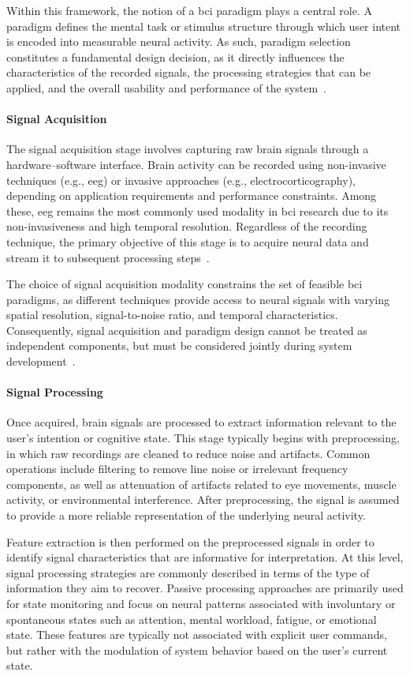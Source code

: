 Within this framework, the notion of a \gls{bci} paradigm plays a central role. A paradigm defines the mental task or stimulus structure through which user intent is encoded into measurable neural activity. As such, paradigm selection constitutes a fundamental design decision, as it directly influences the characteristics of the recorded signals, the processing strategies that can be applied, and the overall usability and performance of the system~\cite{wang-2025}.

\paragraph*{Signal Acquisition}
The signal acquisition stage involves capturing raw brain signals through a hardware--software interface. Brain activity can be recorded using non-invasive techniques (e.g., \gls{eeg}) or invasive approaches (e.g., electrocorticography), depending on application requirements and performance constraints. Among these, \gls{eeg} remains the most commonly used modality in \gls{bci} research due to its non-invasiveness and high temporal resolution. Regardless of the recording technique, the primary objective of this stage is to acquire neural data and stream it to subsequent processing steps~\cite{wang-2025}.

The choice of signal acquisition modality constrains the set of feasible \gls{bci} paradigms, as different techniques provide access to neural signals with varying spatial resolution, signal-to-noise ratio, and temporal characteristics. Consequently, signal acquisition and paradigm design cannot be treated as independent components, but must be considered jointly during system development~\cite{wang-2025}.

\paragraph*{Signal Processing}
Once acquired, brain signals are processed to extract information relevant to the user’s intention or cognitive state. This stage typically begins with preprocessing, in which raw recordings are cleaned to reduce noise and artifacts. Common operations include filtering to remove line noise or irrelevant frequency components, as well as attenuation of artifacts related to eye movements, muscle activity, or environmental interference. After preprocessing, the signal is assumed to provide a more reliable representation of the underlying neural activity.

Feature extraction is then performed on the preprocessed signals in order to identify signal characteristics that are informative for interpretation. At this level, signal processing strategies are commonly described in terms of the type of information they aim to recover. Passive processing approaches are primarily used for state monitoring and focus on neural patterns associated with involuntary or spontaneous states such as attention, mental workload, fatigue, or emotional state. These features are typically not associated with explicit user commands, but rather with the modulation of system behavior based on the user’s current state.

